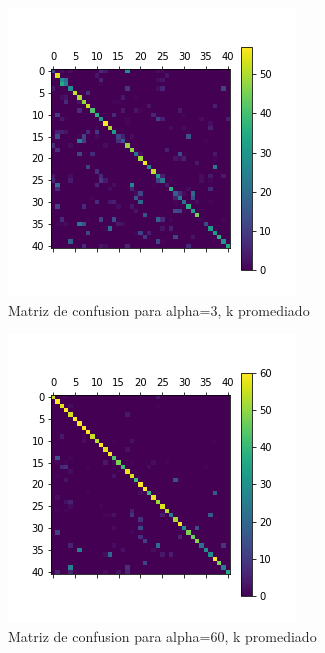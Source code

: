 \begin{figure}[H]
    \begin{center}
      \includegraphics[width=0.6\columnwidth]{imagenes/charuli-des/pca_knn_confusion_matrix_for_alpha_3.png}
      \caption{Matriz de confusion para alpha=3, k promediado}
    \end{center}
\end{figure}
 
\begin{figure}[H]
    \begin{center}
      \includegraphics[width=0.6\columnwidth]{imagenes/charuli-des/pca_knn_confusion_matrix_for_alpha_60.png}
      \caption{Matriz de confusion para alpha=60, k promediado}
    \end{center}
\end{figure}
 
